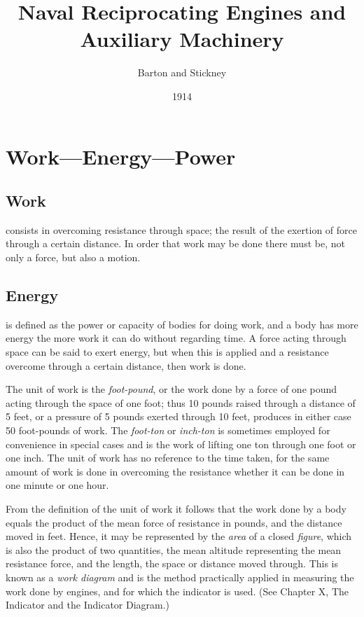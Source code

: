 \documentclass[11pt, a5paper]{book}
\begin{document}
\renewcommand{\thechapter}{\Roman{chapter}}
\title{Naval Reciprocating Engines and Auxiliary Machinery}
\author{Barton and Stickney}
\date{1914}
\maketitle


\chapter{Work---Energy---Power}
\section{Work} consists in overcoming resistance through space; the
result of the exertion of force through a certain distance.  In order
that work may be done there must be, not only a force, but also a
motion.\par

\section{Energy} is defined as the power or capacity of bodies for
doing work, and a body has more energy the more work it can do without
regarding time.  A force acting through space can be said to exert
energy, but when this is applied and a resistance overcome through a
certain distance, then work is done.\par

The unit of work is the \textit{foot-pound}, or the work done by a
force of one pound acting through the space of one foot; thus 10
pounds raised through a distance of 5 feet, or a pressure of 5 pounds
exerted through 10 feet, produces in either case 50 foot-pounds of
work.  The \textit{foot-ton} or \textit{inch-ton} is sometimes
employed for convenience in special cases and is the work of lifting
one ton through one foot or one inch.  The unit of work has no
reference to the time taken, for the same amount of work is done in
overcoming the resistance whether it can be done in one minute or one
hour.\par

From the definition of the unit of work it follows that the work done
by a body equals the product of the mean force of resistance in
pounds, and the distance moved in feet.  Hence, it may be represented
by the \textit{area} of a closed \textit{figure}, which is also the
product of two quantities, the mean altitude representing the mean
resistance force, and the length, the space or distance moved through.
This is known as a \textit{work diagram} and is the method practically
applied in measuring the work done by engines, and for which the
indicator is used.  (See Chapter X, The Indicator and the Indicator
Diagram.)\par
\end{document}
